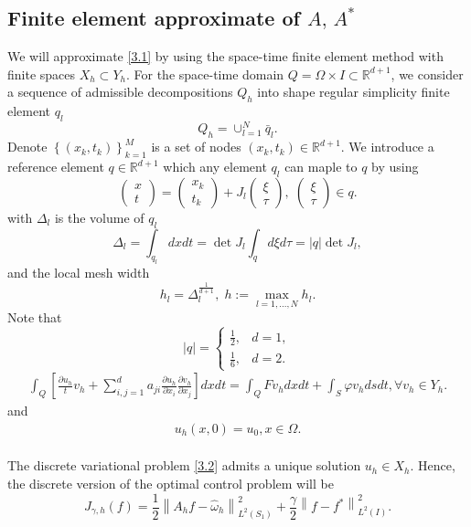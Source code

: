 \documentclass[]{article}
\begin{document}
\subsection{Finite element approximate of $A,\, A^*$}
We will approximate \eqref{3.1} by using the space-time finite element method with finite spaces $X_h \subset Y_h$. For the space-time domain $Q=\Omega\times I\subset \mathbb{R}^{d+1}$, we consider a sequence of admissible decompositions $Q_h$ into shape regular simplicity finite element $q_l$
$$Q_h=\cup_{l=1}^{N}\bar{q}_l.$$
Denote $\left\lbrace (x_k, t_k)\right\rbrace_{k=1}^M $ is a set of nodes $(x_k, t_k)\in \mathbb{R}^{d+1}$. We introduce a reference element $q\in \mathbb{R}^{d+1}$ which any element $q_l$ can maple to $q$ by using
$$\begin{pmatrix}x\\t\end{pmatrix}=\begin{pmatrix}x_k\\t_k\end{pmatrix}+J_l\begin{pmatrix}\xi\\\tau\end{pmatrix}, \; \begin{pmatrix}\xi\\\tau\end{pmatrix}\in q.$$
with $\Delta_l$ is the volume of $q_l$ 
$$\Delta_l=\int_{q_l}dxdt=\det J_l\int_q d\xi d\tau=|q|\det J_l,$$
and the local mesh width
$$h_l=\Delta_l^{\frac{1}{d+1}},\; h:=\max_{l=1, ..., N}h_l.$$
Note that
$$|q|=\begin{cases}
	\frac{1}{2},& d=1,\\[0.1cm]
	\frac{1}{6},& d=2.
\end{cases}$$
\begin{align}\label{3.2}
	\int_{Q}\left[\frac{\partial u_h}{t}v_h+\sum_{i, j=1}^{d}a_{ji}\frac{\partial u_h}{\partial x_i}\frac{\partial v_h}{\partial x_j}\right]dxdt=\int_{Q}Fv_hdxdt+\int_{S}\varphi v_hdsdt, \forall v_h\in Y_h.
\end{align}
and 
\begin{align}\label{3.3}
	u_h(x, 0)=u_0, x\in \Omega.
\end{align}
\\
The discrete variational problem \eqref{3.2} admits a unique solution $u_h\in X_h$. Hence, the discrete version of the optimal control problem will be
$$J_{\gamma, h}(f)=\frac{1}{2}\left\|A_hf-\hat{\omega}_h\right\|^2_{L^2(S_1)}+\frac{\gamma}{2}\left\|f-f^*\right\|^2_{L^2(I)}.$$
\end{document}
